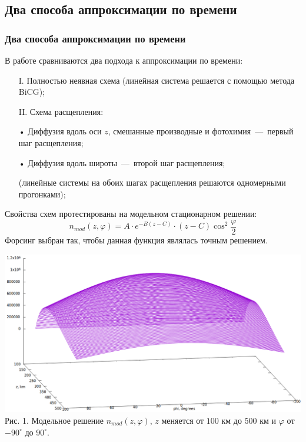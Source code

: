 \documentclass[9pt, apectratio=43,unicode]{beamer}
\begin{document}
\subsection{Два способа аппроксимации по времени}
\begin{frame}\frametitle{Два способа аппроксимации по времени}

В работе сравниваются два подхода к аппроксимации по времени:

\begin{itemize}

\item[I.] Полностью неявная схема (линейная система решается с помощью метода BiCG);

\item[II.] Схема расщепления: 

\end{itemize}

\begin{itemize}

\item[•] Диффузия вдоль оси $z$, смешанные производные и фотохимия~---~первый шаг расщепления; 

\item[•] Диффузия вдоль широты~---~второй шаг расщепления;

\item[] (линейные системы на обоих шагах расщепления решаются одномерными прогонками);

\end{itemize} 



\bigskip 

\parbox[b][5cm][t]{50mm}{
Свойства схем протестированы на модельном стационарном решении: $$n_{mod}(z, \varphi) = A\cdot e^{-B(z-C)}\cdot(z-C)\cos^2\dfrac{\varphi}{2}$$ Форсинг выбран так, чтобы данная функция являлась точным решением.}
\hfill
\parbox[b][5cm][t]{60mm}{
\includegraphics[scale = 0.13]{model}\\Рис. 1. Модельное решение $n_{mod}(z, \varphi)$, $z$ меняется от $100$ км до $500$ км и $\varphi$ от $-90^\circ$ до $90^\circ$.
}
\end{frame}
\end{document}
